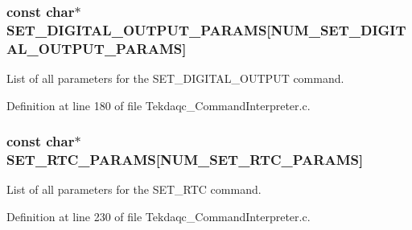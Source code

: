 \hypertarget{group__command__interpreter_gade511743b3ecf569a2e74c1b14291a5b}{
\subsubsection[{S\-E\-T\-\_\-\-D\-I\-G\-I\-T\-A\-L\-\_\-\-O\-U\-T\-P\-U\-T\-\_\-\-P\-A\-R\-A\-M\-S}]{\setlength{\rightskip}{0pt plus 5cm}const char$\ast$ S\-E\-T\-\_\-\-D\-I\-G\-I\-T\-A\-L\-\_\-\-O\-U\-T\-P\-U\-T\-\_\-\-P\-A\-R\-A\-M\-S\mbox{[}{\bf N\-U\-M\-\_\-\-S\-E\-T\-\_\-\-D\-I\-G\-I\-T\-A\-L\-\_\-\-O\-U\-T\-P\-U\-T\-\_\-\-P\-A\-R\-A\-M\-S}\mbox{]}}}\label{group__command__interpreter_gade511743b3ecf569a2e74c1b14291a5b}
List of all parameters for the S\-E\-T\-\_\-\-D\-I\-G\-I\-T\-A\-L\-\_\-\-O\-U\-T\-P\-U\-T command. 

Definition at line 180 of file Tekdaqc\-\_\-\-Command\-Interpreter.\-c.

\hypertarget{group__command__interpreter_ga37a6030d18afb1719e8b674ac3e649ec}{
\subsubsection[{S\-E\-T\-\_\-\-R\-T\-C\-\_\-\-P\-A\-R\-A\-M\-S}]{\setlength{\rightskip}{0pt plus 5cm}const char$\ast$ S\-E\-T\-\_\-\-R\-T\-C\-\_\-\-P\-A\-R\-A\-M\-S\mbox{[}{\bf N\-U\-M\-\_\-\-S\-E\-T\-\_\-\-R\-T\-C\-\_\-\-P\-A\-R\-A\-M\-S}\mbox{]}}}\label{group__command__interpreter_ga37a6030d18afb1719e8b674ac3e649ec}
List of all parameters for the S\-E\-T\-\_\-\-R\-T\-C command. 

Definition at line 230 of file Tekdaqc\-\_\-\-Command\-Interpreter.\-c.

